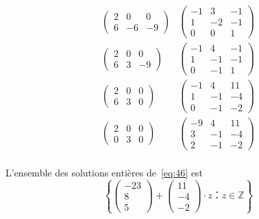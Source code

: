 \begin{example}
\begin{equation}
\begin{array}{cc}
\left(\begin{matrix}2 & 0 & 0\\6 & -6 & -9\end{matrix}\right)&
\left(\begin{matrix}-1 & 3 & -1\\1 & -2 & -1\\0 & 0 & 1\end{matrix}\right)\\

\left(\begin{matrix}2 & 0 & 0\\6 & 3 & -9\end{matrix}\right) &
\left(\begin{matrix}-1 & 4 & -1\\1 & -1 & -1\\0 & -1 & 1\end{matrix}\right)\\

\left(\begin{matrix}2 & 0 & 0\\6 & 3 & 0\end{matrix}\right) &
\left(\begin{matrix}-1 & 4 & 11\\1 & -1 & -4\\0 & -1 & -2\end{matrix}\right)\\


\left(\begin{matrix}2 & 0 & 0\\0 & 3 & 0\end{matrix}\right) &
\left(\begin{matrix}-9 & 4 & 11\\3 & -1 & -4\\2 & -1 & -2\end{matrix}\right)\\
      \end{array}      
    \end{equation}

    L'ensemble des  solutions entières de~\eqref{eq:46} est 
    \begin{displaymath}
      \left\{ \left(\begin{matrix}-23\\8\\5\end{matrix}\right) + \left(\begin{matrix}11\\-4\\-2\end{matrix}\right) ⋅z ： z ∈ℤ\right\}
    \end{displaymath}
    
  \end{example}
  
